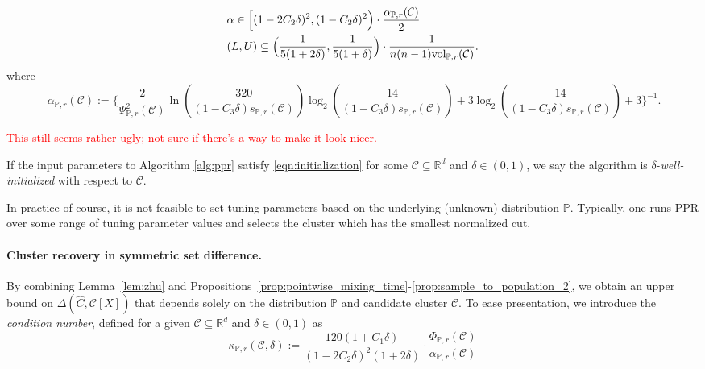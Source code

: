 \documentclass[11pt,twoside]{article}
\newcommand{\Reals}{\mathbb{R}}
\newcommand{\1}{\mathbf{1}}
\newcommand{\Rd}{\Reals^d}
\newcommand{\mc}[1]{\mathcal{#1}}
\newcommand{\Pbb}{\mathbb{P}}
\newcommand{\wh}[1]{\widehat{#1}}
\newcommand{\vol}{\mathrm{vol}}
\begin{document}
\begin{equation}
\label{eqn:initialization}
\begin{aligned}
& \alpha \in \Bigl[(1 - 2C_2\delta)^2, (1 - C_2\delta)^2\Bigr) \cdot
 \frac{\alpha_{\Pbb,r}(\mc{C})}{2} \\
& (L,U) \subseteq \Bigl(\frac{1}{5(1 + 2\delta)},\frac{1}{5(1 + \delta)}\Bigr) \cdot 
\frac{1}{n(n - 1)\vol_{\Pbb,r}(\mc{C})}.
\end{aligned}  
\end{equation}
where
\begin{equation}\
\label{eqn:alpha_initialization}
\alpha_{\Pbb,r}(\mc{C}) := \biggl\{ \frac{2}{\Psi_{\Pbb,r}^2(\mc{C})} \ln \left(\frac{320}{(1 - C_3\delta)s_{\Pbb,r}(\mc{C})}\right)\log_2 \left(\frac{14}{(1 - C_3\delta)s_{\Pbb,r}(\mc{C})}\right)  + 3 \log_2 \left(\frac{14}{(1 - C_3\delta) s_{\Pbb,r}(\mc{C})}\right) + 3\biggr\}^{-1}.
\end{equation}

\textcolor{red}{This still seems rather ugly; not sure if there's a way to make it look nicer.}

\begin{definition}
	If the input parameters to Algorithm \ref{alg:ppr} satisfy \eqref{eqn:initialization} for some $\mc{C} \subseteq \Rd$ and $\delta \in (0,1)$, we say the algorithm is $\delta$-\emph{well-initialized} with respect to $\mc{C}$.
\end{definition}

In practice of course, it is not feasible to set tuning parameters based on the 
underlying (unknown) distribution $\Pbb$. Typically, one runs PPR over some range of
tuning parameter values and selects the cluster which has the smallest
normalized cut.  

\paragraph{Cluster recovery in symmetric set difference.} By combining Lemma~\ref{lem:zhu} and Propositions~\ref{prop:pointwise_mixing_time}-\ref{prop:sample_to_population_2}, we obtain an upper bound on $\Delta(\wh{C},\mc{C}[X])$ that depends solely on the distribution $\Pbb$ and candidate cluster $\mc{C}$. To ease presentation, we introduce the \emph{condition number}, defined for a given $\mc{C} \subseteq \Rd$ and $\delta \in (0,1)$ as
\begin{equation}
\label{eqn:condition_number}
\kappa_{\Pbb,r}(\mc{C},\delta) := \frac{120 (1 + C_1\delta)}{(1 - 2C_2\delta)^2(1 + 2\delta)} \cdot \frac{\Phi_{\Pbb,r}(\mc{C})}{\alpha_{\Pbb,r}(\mc{C})}
\end{equation}
\end{document}

